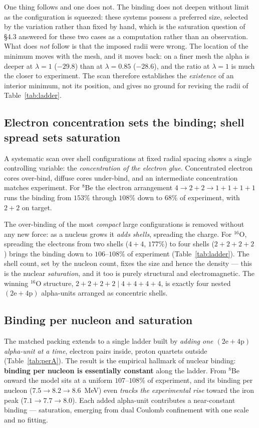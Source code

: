 \documentclass[11pt]{article}
\begin{document}
One thing follows and one does not. The binding does not deepen without limit as the configuration
is squeezed: these systems possess a preferred size, selected by the variation rather than fixed by
hand, which is the saturation question of \S4.3 answered for these two cases as a computation
rather than an observation. What does \emph{not} follow is that the imposed radii were wrong. The
location of the minimum moves with the mesh, and it moves back: on a finer mesh the alpha is deeper
at $\lambda=1$ ($-29.8$) than at $\lambda=0.85$ ($-28.6$), and the ratio at $\lambda=1$ is much the
closer to experiment. The scan therefore establishes the \emph{existence} of an interior minimum,
not its position, and gives no ground for revising the radii of Table~\ref{tab:ladder}.

\subsection{Electron concentration sets the binding; shell spread sets saturation}

A systematic scan over shell configurations at fixed radial spacing shows a single controlling
variable: the \emph{concentration of the electron glue}. Concentrated electron cores over-bind,
diffuse cores under-bind, and an intermediate concentration matches experiment. For $^8$Be the
electron arrangement $4\to 2{+}2\to 1{+}1{+}1{+}1$ runs the binding from $153\%$ through $108\%$
down to $68\%$ of experiment, with $2{+}2$ on target.

The over-binding of the most \emph{compact} large configurations is removed without any new
force: as a nucleus grows it \emph{adds shells}, spreading the charge. For $^{16}$O, spreading
the electrons from two shells ($4{+}4$, $177\%$) to four shells ($2{+}2{+}2{+}2$) brings the
binding down to $106$--$108\%$ of experiment (Table~\ref{tab:ladder}). The shell count, set by
the nucleon count, fixes the size and hence the density --- this is the nuclear
\emph{saturation}, and it too is purely structural and electromagnetic. The winning
$^{16}$O structure, $2{+}2{+}2{+}2\mid 4{+}4{+}4{+}4$, is exactly four nested
$(\mathrm{2e}+\mathrm{4p})$ alpha-units arranged as concentric shells.

\subsection{Binding per nucleon and saturation}
\label{sec:perA}

The matched packing extends to a single ladder built by \emph{adding one
$(\mathrm{2e}+\mathrm{4p})$ alpha-unit at a time}, electron pairs inside, proton quartets
outside (Table~\ref{tab:perA}). The result is the empirical hallmark of nuclear binding:
\textbf{binding per nucleon is essentially constant} along the ladder. From $^8$Be onward the
model sits at a uniform $107$--$108\%$ of experiment, and its binding per nucleon
($7.5\to8.2\to8.6$~MeV) even \emph{tracks the experimental rise} toward the iron peak
($7.1\to7.7\to8.0$). Each added alpha-unit contributes a near-constant binding --- saturation,
emerging from dual Coulomb confinement with one scale and no fitting.
\end{document}
